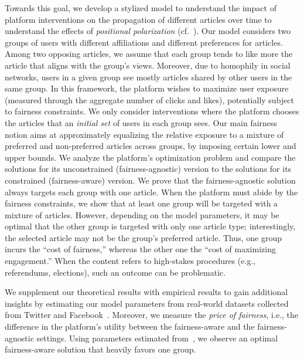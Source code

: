 \documentclass[letterpaper]{article} %
\begin{document}
Towards this goal, we develop a stylized model to understand the impact of platform interventions on the propagation of different articles over time to understand the effects of \emph{positional polarization} (cf.~\citet{Yarchi2020PoliticalPO}).
%
Our model considers two groups of users with different affiliations and different preferences for articles.
%
Among two opposing articles, we assume that each group tends to like more the article that aligns with the group's views.
%
Moreover, due to homophily in social networks, users in a given group see mostly articles shared by other users in the same group.
%
In this framework, the platform wishes to maximize user exposure (measured through the aggregate number of clicks and likes), potentially subject to fairness constraints.
%
We only consider interventions where the platform chooses the articles that an \emph{initial set} of users in each group sees.
%
Our main fairness notion aims at approximately equalizing the relative exposure to a mixture of preferred and non-preferred articles across groups, by imposing certain lower and upper bounds.
%
We analyze the platform's optimization problem and compare the solutions for its unconstrained (fairness-agnostic) version to the solutions for its constrained (fairness-aware) version. 
%
We prove that the fairness-agnostic solution always targets each group with one article. 
%
When the platform must abide by the fairness constraints, we show that at least one group will be targeted with a mixture of articles. 
However, depending on the model parameters, it may be optimal that the other group is targeted with only one article type; interestingly, the selected article may not be the group's preferred article. Thus, one group incurs the ``cost of fairness,'' whereas the other one the ``cost of maximizing engagement.'' When the content refers to high-stakes procedures (e.g., referendums, elections), such an outcome can be problematic.

We supplement our theoretical results with empirical results to gain additional insights by estimating our model parameters from real-world datasets collected from Twitter and Facebook~\citep{balancedExposure,ReplicationExposure}.
%
Moreover, we measure the \emph{price of fairness}, i.e., the difference in the platform's utility between the fairness-aware and the fairness-agnostic settings. 
%
Using parameters estimated from~\citet{ReplicationExposure}, we observe an optimal fairness-aware solution that heavily favors one group.

\end{document}
